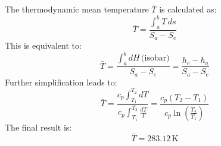 The thermodynamic mean temperature \( \bar{T} \) is calculated as:  
\[
\bar{T} = \frac{\int_a^b T \, ds}{S_a - S_e}
\]  
This is equivalent to:  
\[
\bar{T} = \frac{\int_a^b dH \, \text{(isobar)}}{S_a - S_e} = \frac{h_e - h_a}{S_a - S_e}
\]  
Further simplification leads to:  
\[
\bar{T} = \frac{c_p \int_{T_1}^{T_2} dT}{c_p \int_{T_1}^{T_2} \frac{dT}{T}} = \frac{c_p (T_2 - T_1)}{c_p \ln \left( \frac{T_2}{T_1} \right)}
\]  
The final result is:  
\[
\bar{T} = 283.12 \, \text{K}
\]